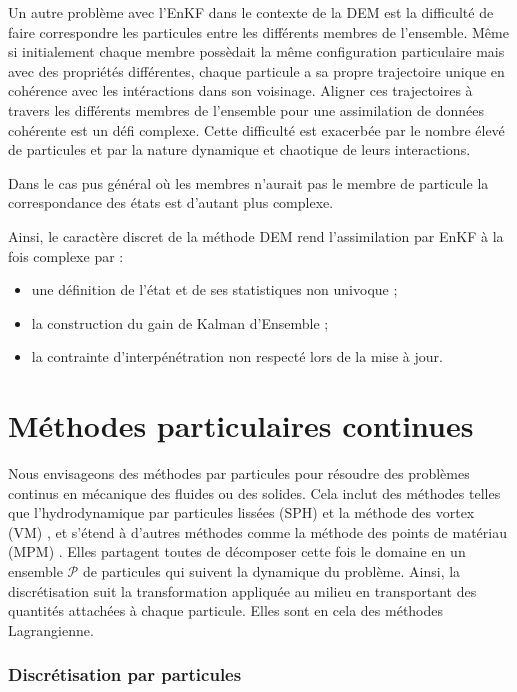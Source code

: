 Un autre problème avec l'EnKF dans le contexte de la DEM est la difficulté de faire correspondre les particules entre les différents membres de l'ensemble. Même si initialement chaque membre possèdait la même configuration particulaire mais avec des propriétés différentes, chaque particule a sa propre trajectoire unique en cohérence avec les intéractions dans son voisinage. Aligner ces trajectoires à travers les différents membres de l'ensemble pour une assimilation de données cohérente est un défi complexe. Cette difficulté est exacerbée par le nombre élevé de particules et par la nature dynamique et chaotique de leurs interactions.

Dans le cas pus général où les membres n'aurait pas le membre de particule la correspondance des états est d'autant plus complexe.

Ainsi, le caractère discret de la méthode DEM rend l'assimilation par EnKF à la fois complexe par :

\begin{itemize}
    \item une définition de l'état et de ses statistiques non univoque ;
    \item la construction du gain de Kalman d'Ensemble ;
    \item la contrainte d'interpénétration non respecté lors de la mise à jour.
\end{itemize}

\section{Méthodes particulaires continues}\label{sec:part_cont}
Nous envisageons des méthodes par particules pour résoudre des problèmes continus en mécanique des fluides ou des solides. Cela inclut des méthodes telles que l'hydrodynamique par particules lissées (SPH) \cite{lucy_1977,gingold_monaghan_sph_1977} et la méthode des vortex (VM) \cite{cottet_vortex_2000}, et s'étend à d'autres méthodes comme la méthode des points de matériau (MPM) \cite{sulsky_particle_1994}. Elles partagent toutes de décomposer cette fois le domaine en un ensemble $\mathcal{P}$ de particules qui suivent la dynamique du problème. Ainsi, la discrétisation suit la transformation appliquée au milieu en transportant des quantités attachées à chaque particule. Elles sont en cela des méthodes Lagrangienne.

\subsubsection{Discrétisation par particules}

